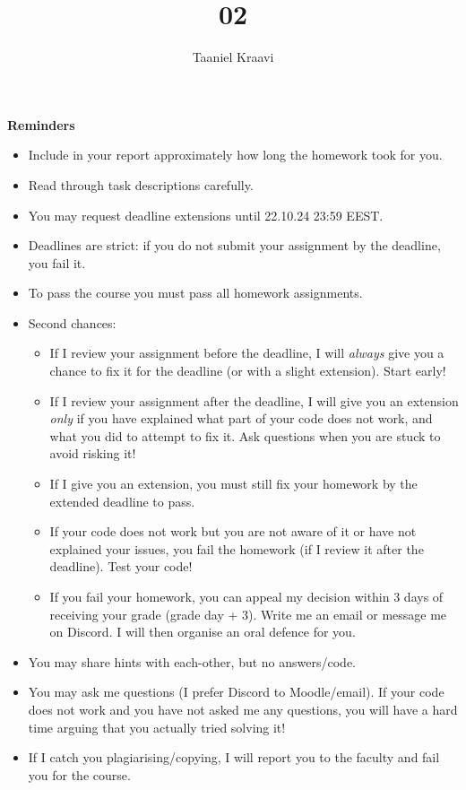 \documentclass{homework}
\title{02}
\author{Taaniel Kraavi}
\date{\DTMdate{2024-10-25}}
\begin{document}
\maketitle

\textbf{Reminders}

\begin{itemize}
  \item Include in your report approximately how long the homework took for you.
  \item Read through task descriptions carefully.
  \item You may request deadline extensions until 22.10.24 23:59 EEST.
  \item Deadlines are strict: if you do not submit your assignment by the deadline, you fail it.
  \item To pass the course you must pass all homework assignments.
  \item Second chances:
  \begin{itemize}
    \item If I review your assignment before the deadline, I will \emph{always} give you a chance to fix it for the deadline (or with a slight extension).
    Start early!
    \item If I review your assignment after the deadline, I will give you an extension \emph{only} if you have explained what part of your code does not work, and what you did to attempt to fix it.
    Ask questions when you are stuck to avoid risking it!
    \item If I give you an extension, you must still fix your homework by the extended deadline to pass.
    \item If your code does not work but you are not aware of it or have not explained your issues, you fail the homework (if I review it after the deadline).
    Test your code!
    \item If you fail your homework, you can appeal my decision within 3 days of receiving your grade (grade day + 3).
    Write me an email or message me on Discord.
    I will then organise an oral defence for you.
  \end{itemize}
  \item You may share hints with each-other, but no answers/code.
  \item You may ask me questions (I prefer Discord to Moodle/email).
  If your code does not work and you have not asked me any questions, you will have a hard time arguing that you actually tried solving it!
  \item If I catch you plagiarising/copying, I will report you to the faculty and fail you for the course.
\end{itemize}
\end{document}
